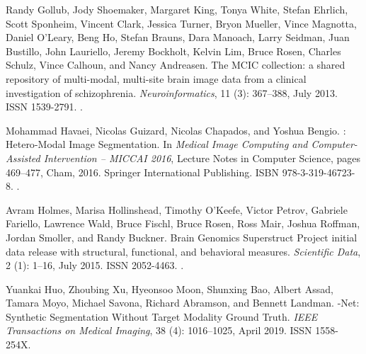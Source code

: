 \documentclass{midl}
\begin{document}
\begin{thebibliography}{50}
Randy Gollub, Jody Shoemaker, Margaret King, Tonya White, Stefan Ehrlich, Scott
  Sponheim, Vincent Clark, Jessica Turner, Bryon Mueller, Vince Magnotta,
  Daniel O’Leary, Beng Ho, Stefan Brauns, Dara Manoach, Larry Seidman, Juan
  Bustillo, John Lauriello, Jeremy Bockholt, Kelvin Lim, Bruce Rosen, Charles
  Schulz, Vince Calhoun, and Nancy Andreasen.
\newblock The {MCIC} collection: a shared repository of multi-modal, multi-site
  brain image data from a clinical investigation of schizophrenia.
\newblock \emph{Neuroinformatics}, 11 (3): 367--388, July
  2013.
\newblock ISSN 1539-2791.
\newblock {}.

Mohammad Havaei, Nicolas Guizard, Nicolas Chapados, and Yoshua Bengio.
: {Hetero}-{Modal} {Image} {Segmentation}.
\newblock In \emph{Medical {Image} {Computing} and {Computer}-{Assisted}
  {Intervention} – {MICCAI} 2016}, Lecture {Notes} in {Computer} {Science},
  pages 469--477, Cham, 2016. Springer International Publishing.
\newblock ISBN 978-3-319-46723-8.
\newblock {}.

Avram Holmes, Marisa Hollinshead, Timothy O’Keefe, Victor Petrov, Gabriele
  Fariello, Lawrence Wald, Bruce Fischl, Bruce Rosen, Ross Mair, Joshua
  Roffman, Jordan Smoller, and Randy Buckner.
\newblock Brain {Genomics} {Superstruct} {Project} initial data release with
  structural, functional, and behavioral measures.
\newblock \emph{Scientific Data}, 2 (1): 1--16, July 2015.
\newblock ISSN 2052-4463.
\newblock {}.

Yuankai Huo, Zhoubing Xu, Hyeonsoo Moon, Shunxing Bao, Albert Assad, Tamara
  Moyo, Michael Savona, Richard Abramson, and Bennett Landman.
-{Net}: {Synthetic} {Segmentation} {Without} {Target}
  {Modality} {Ground} {Truth}.
\newblock \emph{IEEE Transactions on Medical Imaging}, 38
  (4): 1016--1025, April 2019.
\newblock ISSN 1558-254X.


\end{thebibliography}
\end{document}

